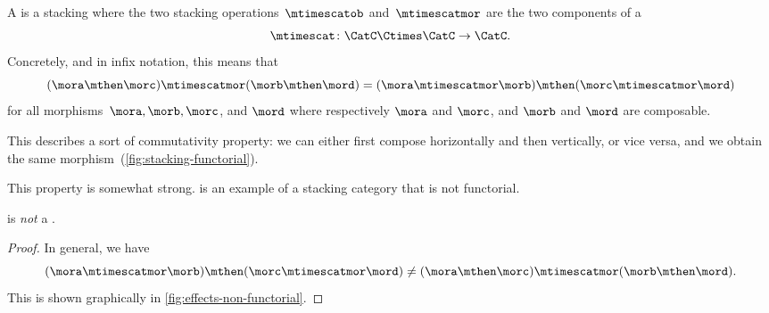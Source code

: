 \begin{ctdefinition}
    \label{def:functorial-stacking-semi-cat}
    A  is a stacking  where the two stacking operations~$\mtimescatob$ and~$\mtimescatmor$ are the two components of a  \begin{equation}
        \mtimescat\colon \CatC \Ctimes \CatC \to \CatC.
    \end{equation}
    Concretely, and in infix notation, this means that
    \begin{equation}
        (\mora \mthen \morc )
        \mtimescatmor (\morb \mthen \mord )
        =
        (\mora \mtimescatmor \morb )
        \mthen (\morc \mtimescatmor \mord )
    \end{equation}
    for all morphisms~$\mora, \morb, \morc$, and $\mord$ where respectively $\mora$ and $\morc$, and $\morb$ and $\mord$ are composable.
\end{ctdefinition}

%
This describes a sort of commutativity property: we can either first compose horizontally and then vertically, or vice versa, and we obtain the same morphism~(\cref{fig:stacking-functorial}).

This property is somewhat strong.
\Effects is an example of a stacking category that is not functorial.

\begin{lemma}
    \label{lem:effects-not-functorial}
    \Effects is \emph{not} a .
\end{lemma}

\begin{proof}
    In general, we have
    \begin{equation}
        (\mora \mtimescatmor \morb )
        \mthen (\morc \mtimescatmor \mord )
        \neq
        (\mora \mthen \morc ) \mtimescatmor (\morb \mthen \mord ).
    \end{equation}
    This is shown graphically in \cref{fig:effects-non-functorial}.
\end{proof}

\begin{figure*}[h]
    \centering
    \hfill
    \hfill
    \hfill
    \caption{Proof that \Effects is not a  category by showing that
        the two morphisms above have different representations in~\SetL.}
    \label{fig:effects-non-functorial}
\end{figure*}

